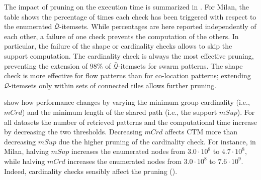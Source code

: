 \documentclass[preprint,12pt,authoryear]{elsarticle} %
\renewcommand{\sf}[1]{\textsf{\textup{#1}}}
\begin{document}
The impact of pruning on the execution time is summarized in .
For \sf{Milan}, the table shows the percentage of times each check has been triggered with respect to the enumerated $\bar{\mathcal{Q}}$-itemsets. While percentages are here reported independently of each other, a failure of one check prevents the computation of the others. In particular, the failure of the shape or cardinality checks allows to skip the support computation. 
The cardinality check is always the most effective pruning, preventing the extension of 98\% of $\bar{\mathcal{Q}}$-itemsets for swarm patterns.
The shape check is more effective for flow patterns than for co-location patterns; extending $\bar{\mathcal{Q}}$-itemsets only within sets of connected tiles allows further pruning.

 show how performance changes by varying the minimum group cardinality (i.e., $mCrd$) and the minimum length of the shared path (i.e., the support $mSup$). 
For all datasets the number of retrieved patterns and the computational time increase by decreasing the two thresholds.
Decreasing $mCrd$ affects CTM more than decreasing $mSup$ due the higher pruning of the cardinality check.
For instance, in \sf{Milan}, halving $mSup$ increases the enumerated nodes from $3.0 \cdot 10^{8}$ to $4.7 \cdot 10^{8}$, while halving $mCrd$ increases the enumerated nodes from $3.0 \cdot 10^{8}$ to $7.6 \cdot 10^{9}$. Indeed, cardinality checks sensibly affect the pruning ().
\end{document}
